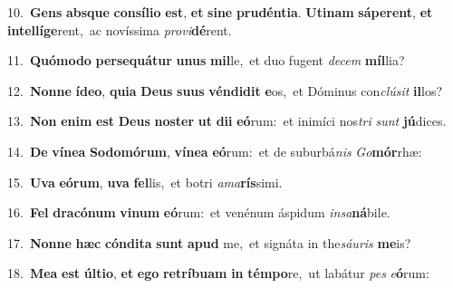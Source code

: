 {{\numbfont\textcolor{\numbcolor}{10.}}~\textbf{Gens} \textbf{abs}\-\textbf{que} \textbf{con}\-\textbf{sí}\textbf{li}\textbf{o} \textbf{est}\-, \textbf{et} \textbf{si}\-\textbf{ne} \textbf{pru}\-\textbf{dén}\textbf{ti}\textbf{a}. \textbf{U}\-\textbf{ti}\textbf{nam} \textbf{sá}\-\textbf{pe}\textbf{rent}, \textbf{et} \textbf{in}\-\textbf{tel}\textbf{lí}\textbf{ge}rent,~\star ac novíssima \textit{pro}\-\textit{vi}\textbf{dé}rent.\par
{\numbfont\textcolor{\numbcolor}{11.}}~\-\textbf{Quó}\-\textbf{mo}\textbf{do} \textbf{per}\-\textbf{se}\textbf{quá}\textbf{tur} \textbf{u}\-\textbf{nus} \textbf{mil}\-le,~\star et duo fugent \textit{de}\-\textit{cem} \textbf{míl}\-lia?\par
{\numbfont\textcolor{\numbcolor}{12.}}~\-\textbf{Non}\-\textbf{ne} \textbf{íd}\-\textbf{e}\textbf{o}, \textbf{qui}\-\textbf{a} \textbf{De}\-\textbf{us} \textbf{su}\-\textbf{us} \textbf{vén}\-\textbf{di}\textbf{dit} \textbf{e}\-os,~\star et Dóminus con\-\textit{clú}\-\textit{sit} \textbf{il}\-los?\par
{\numbfont\textcolor{\numbcolor}{13.}}~\textbf{Non} \textbf{e}\-\textbf{nim} \textbf{est} \textbf{De}\-\textbf{us} \textbf{nos}\-\textbf{ter} \textbf{ut} \textbf{di}\-\textbf{i} \textbf{e}\-\textbf{ó}rum:~\star et inimíci nos\textit{tri} \textit{sunt} \textbf{jú}\-dices.\par
{\numbfont\textcolor{\numbcolor}{14.}}~\textbf{De} \textbf{ví}\-\textbf{ne}\textbf{a} \textbf{So}\-\textbf{do}\textbf{mó}\textbf{rum}, \textbf{ví}\-\textbf{ne}\textbf{a} \textbf{e}\-\textbf{ó}rum:~\star et de suburbá\textit{nis} \textit{Go}\-\textbf{mór}rhæ:\par
{\numbfont\textcolor{\numbcolor}{15.}}~\-\textbf{U}\-\textbf{va} \textbf{e}\-\textbf{ó}\textbf{rum}, \textbf{u}\-\textbf{va} \textbf{fel}\-lis,~\star et botri \textit{a}\-\textit{ma}\textbf{rís}simi.\par
{\numbfont\textcolor{\numbcolor}{16.}}~\textbf{Fel} \textbf{dra}\-\textbf{có}\textbf{num} \textbf{vi}\-\textbf{num} \textbf{e}\-\textbf{ó}rum:~\star et venénum áspidum \textit{in}\-\textit{sa}\textbf{ná}bile.\par
{\numbfont\textcolor{\numbcolor}{17.}}~\-\textbf{Non}\-\textbf{ne} \textbf{hæc} \textbf{cón}\-\textbf{di}\textbf{ta} \textbf{sunt} \textbf{a}\-\textbf{pud} me,~\star et signáta in the\-\textit{sáu}\-\textit{ris} \textbf{me}\-is?\par
{\numbfont\textcolor{\numbcolor}{18.}}~\-\textbf{Me}\-\textbf{a} \textbf{est} \textbf{úl}\-\textbf{ti}\textbf{o}, \textbf{et} \textbf{e}\-\textbf{go} \textbf{re}\-\textbf{trí}\textbf{bu}\textbf{am} \textbf{in} \textbf{tém}\-\textbf{po}re,~\star ut labátur \textit{pes} \textit{e}\-\textbf{ó}rum:\par
}

